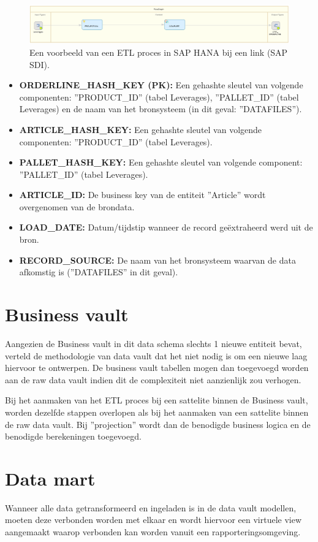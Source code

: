 \begin{figure}[h]
	\centering
	\includegraphics[scale=0.45]{../images/DV_FG_link.png}
	\caption{Een voorbeeld van een ETL proces in SAP HANA bij een link (SAP SDI).}
	\label{fig:etllink}
\end{figure}

\begin{itemize}
	\item \textbf{ORDERLINE\_HASH\_KEY (PK):} Een gehashte sleutel van volgende componenten: ''PRODUCT\_ID'' (tabel Leverages), ''PALLET\_ID'' (tabel Leverages)  en de naam van het bronsysteem (in dit geval: ''DATAFILES'').
	\item \textbf{ARTICLE\_HASH\_KEY:} Een gehashte sleutel van volgende componenten: ''PRODUCT\_ID'' (tabel Leverages).
	\item \textbf{PALLET\_HASH\_KEY:} Een gehashte sleutel van volgende component: ''PALLET\_ID'' (tabel Leverages).
	\item \textbf{ARTICLE\_ID:} De business key van de entiteit ''Article'' wordt overgenomen van de brondata.
	\item \textbf{LOAD\_DATE:} Datum/tijdstip wanneer de record geëxtraheerd werd uit de bron.
	\item \textbf{RECORD\_SOURCE:} De naam van het bronsysteem waarvan de data afkomstig is (''DATAFILES'' in dit geval).
\end{itemize}

\section{Business vault}
Aangezien de Business vault in dit data schema slechts 1 nieuwe entiteit bevat, verteld de methodologie van data vault dat het niet nodig is om een nieuwe laag hiervoor te ontwerpen. De business vault tabellen mogen dan toegevoegd worden aan de raw data vault indien dit de complexiteit niet aanzienlijk zou verhogen.

Bij het aanmaken van het ETL proces bij een sattelite binnen de Business vault, worden dezelfde stappen overlopen als bij het aanmaken van een sattelite binnen de raw data vault. Bij ''projection'' wordt dan de benodigde business logica en de benodigde berekeningen toegevoegd.

\section{Data mart}
Wanneer alle data getransformeerd en ingeladen is in de data vault modellen, moeten deze verbonden worden met elkaar en wordt hiervoor een virtuele view aangemaakt waarop verbonden kan worden vanuit een rapporteringsomgeving.

